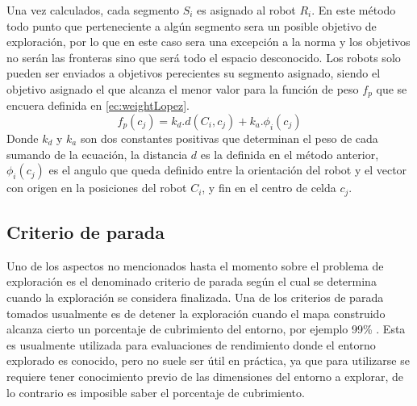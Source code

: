 Una vez calculados, cada segmento $S_i$ es asignado al robot $R_i$. En este método todo punto que perteneciente a algún segmento sera un posible objetivo de exploración, por lo que en este caso sera una excepción a la norma y los objetivos no serán las fronteras sino que será todo el espacio desconocido. Los robots solo pueden ser enviados a objetivos perecientes su segmento asignado, siendo el objetivo asignado el que alcanza el menor valor para la función de peso $f_p$ que se encuera definida en \eqref{ec:weightLopez}.
\begin{equation}\label{ec:weightLopez}
  f_p(c_j) = k_d.d(C_i,c_j) + k_a.\phi_i(c_j)
\end{equation}
Donde $k_d$ y $k_a$ son dos constantes positivas que determinan el peso de cada sumando de la ecuación, la distancia $d$ es la definida en el método anterior, $\phi_i(c_j)$ es el angulo que queda definido entre la orientación del robot y el vector con origen en la posiciones del robot $C_i$, y fin en el centro de celda $c_j$. 


\subsection{Criterio de parada}
Uno de los aspectos no mencionados hasta el momento sobre el problema de exploración es el denominado criterio de parada según el cual se determina cuando la exploración se considera finalizada. 
Una de los criterios de parada tomados usualmente es de detener la exploración cuando el mapa construido alcanza cierto un porcentaje de cubrimiento del entorno, por ejemplo 99\% \cite{Yan2015}. Esta es usualmente utilizada para evaluaciones de rendimiento donde el entorno explorado es conocido, pero no suele ser útil en práctica, ya que para utilizarse se requiere tener conocimiento previo de las dimensiones del entorno a explorar, de lo contrario es imposible saber el porcentaje de cubrimiento.

